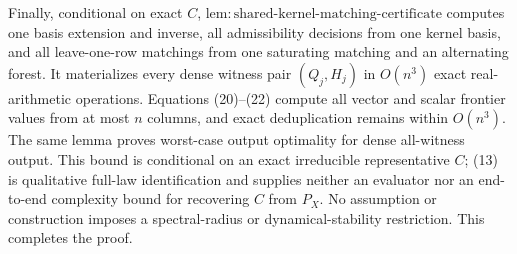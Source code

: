 Finally, conditional on exact \(C\), \(\mathrm{lem:shared\text{-}kernel\text{-}matching\text{-}certificate}\) computes one basis extension and inverse, all admissibility decisions from one kernel basis, and all leave-one-row matchings from one saturating matching and an alternating forest. It materializes every dense witness pair \((Q_j,H_j)\) in \(O(n^3)\) exact real-arithmetic operations. Equations (20)--(22) compute all vector and scalar frontier values from at most \(n\) columns, and exact deduplication remains within \(O(n^3)\). The same lemma proves worst-case output optimality for dense all-witness output. This bound is conditional on an exact irreducible representative \(C\); (13) is qualitative full-law identification and supplies neither an evaluator nor an end-to-end complexity bound for recovering \(C\) from \(P_X\). No assumption or construction imposes a spectral-radius or dynamical-stability restriction. This completes the proof.